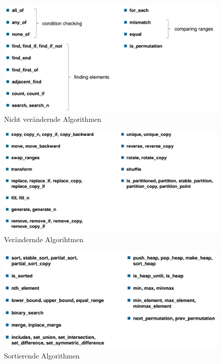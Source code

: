 \begin{figure}[h]
\centering
\includegraphics[width=0.7\linewidth]{images/non_modifying_algorithms}
\caption{Nicht verändernde Algorithmen}
\label{fig:nonmodifyingalgorithms}
\end{figure}

\begin{figure}[h]
\centering
\includegraphics[width=0.7\linewidth]{images/mutating_algorithms}
\caption{Verändernde Algorihtmen}
\label{fig:mutatingalgorithms}
\end{figure}

\begin{figure}[h]
\centering
\includegraphics[width=0.7\linewidth]{images/sorting_algorithms}
\caption{Sortierende Algorithmen}
\label{fig:sortingalgorithms}
\end{figure}

